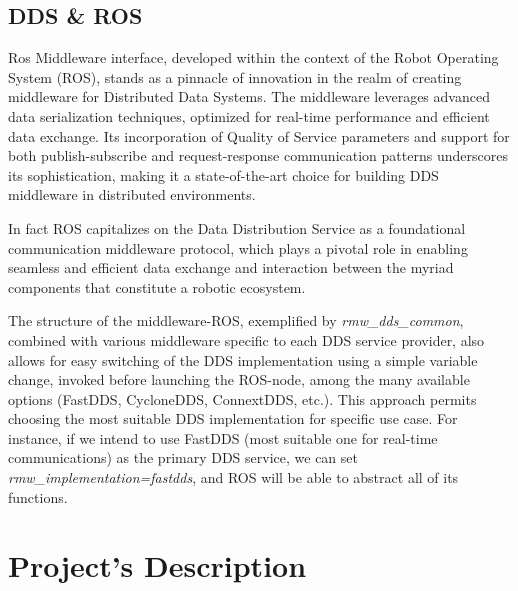 \subsection{DDS \& ROS} \label{SSEC:rosiface}

Ros Middleware interface\cite{ros2iface}, developed within the context of the Robot Operating System (ROS), stands as a pinnacle of innovation in the realm of creating middleware for Distributed Data Systems. The middleware leverages advanced data serialization techniques, optimized for real-time performance and efficient data exchange. Its incorporation of Quality of Service parameters and support for both publish-subscribe and request-response communication patterns underscores its sophistication, making it a state-of-the-art choice for building DDS middleware in distributed environments.

In fact ROS capitalizes on the Data Distribution Service as a foundational communication middleware protocol\cite{ros2iron}, which plays a pivotal role in enabling seamless and efficient data exchange and interaction between the myriad components that constitute a robotic ecosystem.

The structure of the middleware-ROS, exemplified by \emph{rmw\_dds\_common}\cite{ros2iron}, combined with various middleware specific to each DDS service provider, also allows for easy switching of the DDS implementation using a simple variable change, invoked before launching the ROS-node, among the many available options (FastDDS, CycloneDDS, ConnextDDS, etc.). 
This approach permits choosing the most suitable DDS implementation for specific use case. For instance, if we intend to use FastDDS (most suitable one for real-time communications) as the primary DDS service, we can set \emph{rmw\_implementation=fastdds}, and ROS will be able to abstract all of its functions.

\section{Project's Description} \label{SEC:pd}

